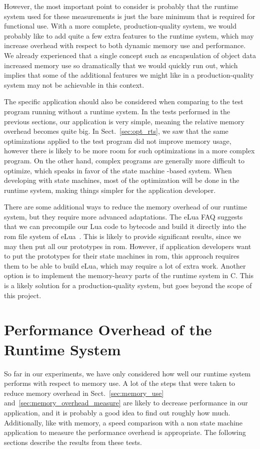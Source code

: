 However, the most important point to consider is probably that the runtime system used for these measurements is just the bare minimum that is required for functional use. With a more complete, production-quality system, we would probably like to add quite a few extra features to the runtime system, which may increase overhead with respect to both dynamic memory use and performance. We already experienced that a single concept such as encapsulation of object data increased memory use so dramatically that we would quickly run out, which implies that some of the additional features we might like in a production-quality system may not be achievable in this context.

The specific application should also be considered when comparing to the test program running without a runtime system. In the tests performed in the previous sections, our application is very simple, meaning the relative memory overhead becomes quite big. In Sect.~\ref{sec:opt_rts}, we saw that the same optimizations applied to the test program did not improve memory usage, however there is likely to be more room for such optimizations in a more complex program. On the other hand, complex programs are generally more difficult to optimize, which speaks in favor of the state machine -based system. When developing with state machines, most of the optimization will be done in the runtime system, making things simpler for the application developer.

There are some additional ways to reduce the memory overhead of our runtime system, but they require more advanced adaptations. The eLua FAQ suggests that we can precompile our Lua code to bytecode and build it directly into the \gls{rom} file system of eLua~\cite{website:elua_faq}. This is likely to provide significant results, since we may then put all our prototypes in \gls{rom}. However, if application developers want to put the prototypes for their state machines in \gls{rom}, this approach requires them to be able to build eLua, which may require a lot of extra work. Another option is to implement the memory-heavy parts of the runtime system in C. This is a likely solution for a production-quality system, but goes beyond the scope of this project.

\FloatBarrier
\section{Performance Overhead of the Runtime System}
\label{sec:performance_overhead}
So far in our experiments, we have only considered how well our runtime system performs with respect to memory use. A lot of the steps that were taken to reduce memory overhead in Sect.~\ref{sec:memory_use} and~\ref{sec:memory_overhead_measure} are likely to decrease performance in our application, and it is probably a good idea to find out roughly how much. Additionally, like with memory, a speed comparison with a non state machine application to measure the performance overhead is appropriate. The following sections describe the results from these tests.

